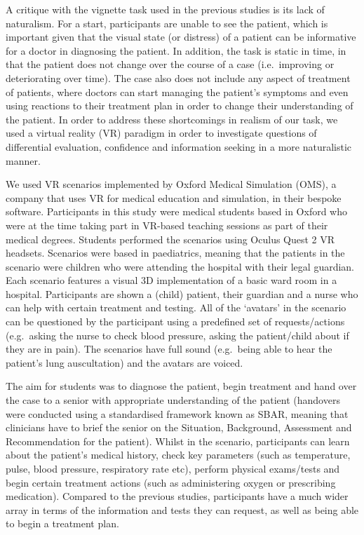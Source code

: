 \documentclass[a4paper, nobind]{templates/ociamthesis}
\begin{document}
\adjustmtc
{}

A critique with the vignette task used in the previous studies is its lack of naturalism. For a start, participants are unable to see the patient, which is important given that the visual state (or distress) of a patient can be informative for a doctor in diagnosing the patient. In addition, the task is static in time, in that the patient does not change over the course of a case (i.e.~improving or deteriorating over time). The case also does not include any aspect of treatment of patients, where doctors can start managing the patient's symptoms and even using reactions to their treatment plan in order to change their understanding of the patient. In order to address these shortcomings in realism of our task, we used a virtual reality (VR) paradigm in order to investigate questions of differential evaluation, confidence and information seeking in a more naturalistic manner.

We used VR scenarios implemented by Oxford Medical Simulation (OMS), a company that uses VR for medical education and simulation, in their bespoke software. Participants in this study were medical students based in Oxford who were at the time taking part in VR-based teaching sessions as part of their medical degrees. Students performed the scenarios using Oculus Quest 2 VR headsets. Scenarios were based in paediatrics, meaning that the patients in the scenario were children who were attending the hospital with their legal guardian. Each scenario features a visual 3D implementation of a basic ward room in a hospital. Participants are shown a (child) patient, their guardian and a nurse who can help with certain treatment and testing. All of the `avatars' in the scenario can be questioned by the participant using a predefined set of requests/actions (e.g.~asking the nurse to check blood pressure, asking the patient/child about if they are in pain). The scenarios have full sound (e.g.~being able to hear the patient's lung auscultation) and the avatars are voiced.

The aim for students was to diagnose the patient, begin treatment and hand over the case to a senior with appropriate understanding of the patient (handovers were conducted using a standardised framework known as SBAR, meaning that clinicians have to brief the senior on the Situation, Background, Assessment and Recommendation for the patient). Whilst in the scenario, participants can learn about the patient's medical history, check key parameters (such as temperature, pulse, blood pressure, respiratory rate etc), perform physical exams/tests and begin certain treatment actions (such as administering oxygen or prescribing medication). Compared to the previous studies, participants have a much wider array in terms of the information and tests they can request, as well as being able to begin a treatment plan.
\end{document}

